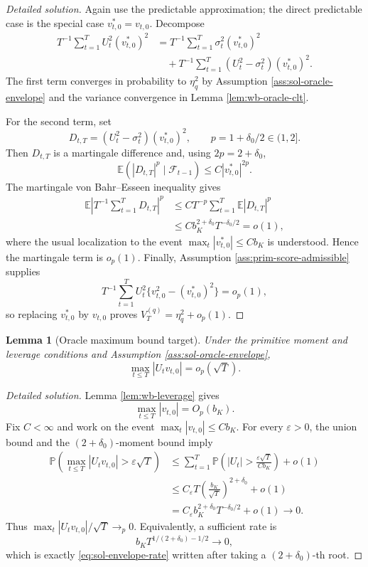 \documentclass[12pt]{article}
\numberwithin{equation}{section}
\newtheorem{lemma}{Lemma}
\theoremstyle{definition}
\newcommand{\E}{\mathbb E}
\newcommand{\Pp}{\mathbb P}
\begin{document}
\begin{proof}[Detailed solution]
Again use the predictable approximation; the direct predictable case is the
special case \(v_{t,0}^\ast=v_{t,0}\).  Decompose
\begin{align*}
    T^{-1}\sum_{t=1}^TU_t^2(v_{t,0}^\ast)^2
    &=T^{-1}\sum_{t=1}^T\sigma_t^2(v_{t,0}^\ast)^2\\
    &\quad+T^{-1}\sum_{t=1}^T
       (U_t^2-\sigma_t^2)(v_{t,0}^\ast)^2.
\end{align*}
The first term converges in probability to \(\eta_q^2\) by Assumption
\ref{ass:sol-oracle-envelope} and the variance convergence in Lemma
\ref{lem:wb-oracle-clt}.

For the second term, set
\[
    D_{t,T}=(U_t^2-\sigma_t^2)(v_{t,0}^\ast)^2,
    \qquad p=1+\delta_0/2\in(1,2].
\]
Then \(D_{t,T}\) is a martingale difference and, using
\(2p=2+\delta_0\),
\[
    \E(|D_{t,T}|^p\mid\mathcal F_{t-1})
    \leq C|v_{t,0}^\ast|^{2p}.
\]
The martingale von Bahr--Esseen inequality gives
\begin{align*}
    \E\left|
      T^{-1}\sum_{t=1}^TD_{t,T}
    \right|^p
    &\leq C T^{-p}\sum_{t=1}^T\E|D_{t,T}|^p\\
    &\leq C b_K^{2+\delta_0}T^{-\delta_0/2}=o(1),
\end{align*}
where the usual localization to the event
\(\max_t|v_{t,0}^\ast|\leq Cb_K\) is understood.  Hence the martingale term is
\(o_p(1)\).  Finally, Assumption \ref{ass:prim-score-admissible} supplies
\[
    T^{-1}\sum_{t=1}^TU_t^2
       \{v_{t,0}^2-(v_{t,0}^\ast)^2\}=o_p(1),
\]
so replacing \(v_{t,0}^\ast\) by \(v_{t,0}\) proves
\(V_T^{(q)}=\eta_q^2+o_p(1)\).
\end{proof}


\begin{lemma}[Oracle maximum bound target]
\label{lem:wb-oracle-max}
Under the primitive moment and leverage conditions and Assumption
\ref{ass:sol-oracle-envelope},
\[
    \max_{t\leq T}|U_tv_{t,0}|=o_p(\sqrt T).
\]
\end{lemma}


\begin{proof}[Detailed solution]
Lemma \ref{lem:wb-leverage} gives
\[
    \max_{t\leq T}|v_{t,0}|=O_p(b_K).
\]
Fix \(C<\infty\) and work on the event
\(\max_t|v_{t,0}|\leq Cb_K\).  For every \(\varepsilon>0\), the union bound
and the \((2+\delta_0)\)-moment bound imply
\begin{align*}
    \Pp\left(
      \max_{t\leq T}|U_tv_{t,0}|>\varepsilon\sqrt T
    \right)
    &\leq
      \sum_{t=1}^T
      \Pp\left(
        |U_t|>\frac{\varepsilon\sqrt T}{Cb_K}
      \right)+o(1)\\
    &\leq
      C_\varepsilon T
      \left(\frac{b_K}{\sqrt T}\right)^{2+\delta_0}+o(1)\\
    &=C_\varepsilon b_K^{2+\delta_0}T^{-\delta_0/2}+o(1)
      \longrightarrow0.
\end{align*}
Thus \(\max_t|U_tv_{t,0}|/\sqrt T\to_p0\).  Equivalently, a sufficient rate
is
\[
    b_KT^{1/(2+\delta_0)-1/2}\to0,
\]
which is exactly \eqref{eq:sol-envelope-rate} written after taking a
\((2+\delta_0)\)-th root.
\end{proof}
\end{document}
